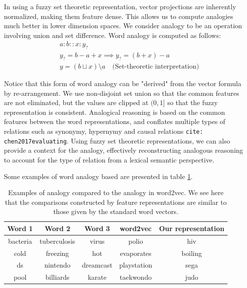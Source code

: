 \documentclass[11pt]{book}
\newcommand{\citep}[1]{\texttt{cite: #1}}
\begin{document}
In using a fuzzy set theoretic representation, vector projections are
inherently normalized, making them feature dense. This allows us to compute
analogies much better in lower dimension spaces. We consider analogy to be an
operation involving union and set difference. Word analogy is computed as
follows:
\begin{equation*}
\begin{split}
    &a : b :: x : y_? \\
    &y_? = b - a + x \implies y_? = (b + x) - a \\
    &y = (b \sqcup x) \setminus a \quad \text{(Set-theoretic interpretation)}
\end{split}
\end{equation*}

Notice that this form of word analogy can be "derived" from the vector formula
by re-arrangement. We use non-disjoint set union so that the common features
are not eliminated, but the values are clipped at $(0,1]$ so that the fuzzy
representation is consistent. Analogical reasoning is based on the common
features between the word representations, and conflates multiple types of
relations such as synonymy, hypernymy and causal relations
\citep{chen2017evaluating}. Using fuzzy set theoretic representations, we can
also provide a context for the analogy, effectively reconstructing analogous
reasoning to account for the type of relation from a lexical semantic
perspective.

Some examples of word analogy based are presented in table \ref{tab: analogy}. 

\begin{table}[]
    \centering
    {\tiny
    \begin{tabular}{ccc|c|c}
        \bf Word 1  & \bf Word 2    & \bf Word 3    & \bf word2vec  & \bf Our representation    \\ \hline
        bacteria    & tuberculosis  & virus         & polio         & hiv                       \\
        cold        & freezing      & hot           & evaporates    & boiling                   \\
        ds          & nintendo      & dreamcast     & playstation   & sega                      \\
        pool        & billiards     & karate        & taekwondo     & judo                      \\
    \end{tabular}
    }
    \caption{Examples of analogy compared to the analogy in word2vec. We see here that the comparisons constructed by feature representations are similar to those given by the standard word vectors.}
    \label{tab: analogy}
\end{table}
\end{document}

